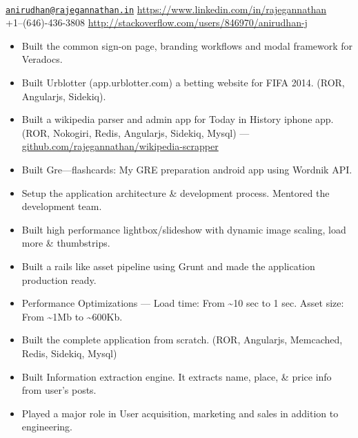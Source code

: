 \documentclass{resume}
\begin{document}
\\
{\href{mailto:anirudhan@rajegannathan.in}{\nolinkurl{anirudhan@rajegannathan.in}} \hfill \url{https://www.linkedin.com/in/rajegannathan}}\\
{+1--(646)-436-3808 \hfill \url{http://stackoverflow.com/users/846970/anirudhan-j}}

\begin{itemize} \itemsep1pt \parskip0pt
  \item Built the common sign-on page, branding workflows and modal framework for Veradocs.
  \item Built Urblotter (app.urblotter.com) a betting website for FIFA 2014. (ROR, Angularjs, Sidekiq).
  \item Built a wikipedia parser and admin app for Today in History iphone app. (ROR, Nokogiri, Redis, Angularjs, Sidekiq, Mysql) --- \url{github.com/rajegannathan/wikipedia-scrapper}
  \item Built Gre---flashcards: My GRE preparation android app using Wordnik API\@.
\end{itemize}
\begin{itemize} \itemsep1pt \parskip0pt
  \item Setup the application architecture \& development process. Mentored the development team.
  \item Built high performance lightbox/slideshow with dynamic image scaling, load more \& thumbstrips.
  \item Built a rails like asset pipeline using Grunt and made the application production ready.
  \item Performance Optimizations --- Load time: From \textasciitilde10 sec to 1 sec.  Asset size: From \textasciitilde1Mb to \textasciitilde600Kb.
\end{itemize}
\begin{itemize} \itemsep1pt \parskip0pt
  \item Built the complete application from scratch. (ROR, Angularjs, Memcached, Redis, Sidekiq, Mysql)
  \item Built Information extraction engine. It extracts name, place, \& price info from user's posts.
  \item Played a major role in User acquisition, marketing and sales in addition to engineering. 
\end{itemize}
\end{document}
